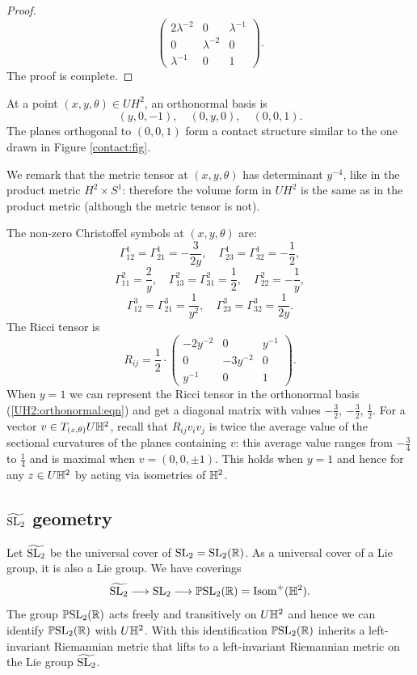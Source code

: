 \begin{proof}
$$\begin{pmatrix}
2\lambda^{-2} & 0 & \lambda^{-1} \\
0 & \lambda^{-2} & 0 \\
\lambda^{-1} & 0 & 1
\end{pmatrix}.
$$
The proof is complete.
\end{proof}
At a point $(x,y,\theta) \in UH^2$, an orthonormal basis is
\begin{equation} \label{UH2:orthonormal:eqn}
(y,0,-1), \quad (0,y,0), \quad (0,0,1).
\end{equation}
The planes orthogonal to $(0,0,1)$ form a contact structure similar to the one drawn in Figure \ref{contact:fig}. 

We remark that the metric tensor at $(x,y,\theta)$ has determinant $y^{-4}$, like in the product metric $H^2 \times S^1$: therefore the volume form in $UH^2$ is the same as in the product metric (although the metric tensor is not).

The non-zero Christoffel symbols at $(x,y,\theta)$ are:
$$\Gamma^1_{12} = \Gamma^1_{21} = -\frac 3{2y}, \quad 
\Gamma^1_{23} = \Gamma^1_{32} = -\frac 12,$$
$$\Gamma^2_{11} = \frac 2y, \quad
\Gamma^2_{13} = \Gamma^2_{31} = \frac 12, \quad \Gamma^2_{22} = -\frac 1y,$$
$$\Gamma^3_{12} = \Gamma^3_{21} = \frac 1{y^2}, \quad
\Gamma^3_{23} = \Gamma^3_{32} = \frac 1{2y}.$$
The Ricci tensor is
$$
R_{ij} = \frac 12 \cdot
\begin{pmatrix}
-2 y^{-2} & 0 & y^{-1} \\
0 & - 3y^{-2} & 0 \\
y^{-1} & 0 & 1
\end{pmatrix}.
$$
When $y=1$ we can represent the Ricci tensor in the orthonormal basis (\ref{UH2:orthonormal:eqn}) and get a diagonal matrix with values $-\frac 32$, $-\frac 32$, $\frac 12$. For a vector $v\in T_{(z,\theta)} U\mathbb{H}^2$, recall that $R_{ij}v_iv_j$ is twice the average value of the sectional curvatures of the planes containing $v$: this average value ranges from $-\frac 34$ to $\frac 14$ and is maximal when $v=(0,0,\pm 1)$. This holds when $y=1$ and hence for any $z\in U\mathbb{H}^2$ by acting via isometries of $\mathbb{H}^2$. 

\subsection{$\widetilde{{\rm SL}_2}$ geometry}
Let $\widetilde {{\rm SL}_2}$ be the universal cover of ${\rm SL}_2 = {\rm SL}_2(\mathbb{R})$. 
As a universal cover of a Lie group, it is also a Lie group.
We have coverings
$$\widetilde{{\rm SL}_2} \longrightarrow {\rm SL}_2 \longrightarrow \mathbb{P}{\rm SL}_2(\mathbb{R}) = {\rm Isom}^+(\mathbb{H}^2).$$
The group $\mathbb{P}{\rm SL}_2(\mathbb{R})$ acts freely and transitively on $U\mathbb{H}^2$ and hence we can identify $\mathbb{P}{\rm SL}_2(\mathbb{R})$ with $U\mathbb{H}^2$. With this identification $\mathbb{P}{\rm SL}_2(\mathbb{R})$ inherits a left-invariant Riemannian metric that lifts to a left-invariant Riemannian metric on the Lie group $\widetilde{{\rm SL}_2}$. 

